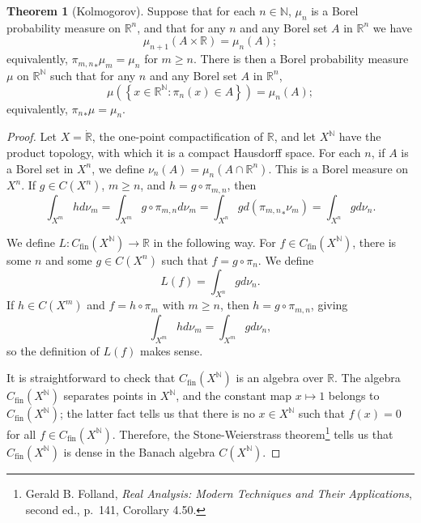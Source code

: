 \documentclass{article}
\theoremstyle{definition}
\newtheorem{theorem}{Theorem}
\theoremstyle{definition}
\begin{document}
\begin{theorem}[Kolmogorov]
Suppose that for each $n \in \mathbb{N}$, $\mu_n$ is a Borel probability measure on $\mathbb{R}^n$, and that for any $n$ and any Borel set $A$ in $\mathbb{R}^n$ we have
\[
\mu_{n+1}(A \times \mathbb{R}) = \mu_n(A);
\]
equivalently, ${\pi_{m,n}}_* \mu_m=\mu_n$ for $m \geq n$.
There is then a Borel probability measure $\mu$ on $\mathbb{R}^{\mathbb{N}}$ such that for any $n$ and any Borel set $A$
in $\mathbb{R}^n$,
\[
\mu\left( \left\{ x \in \mathbb{R}^\mathbb{N}: \pi_n(x) \in A\right\}\right)=\mu_n(A);
\]
equivalently, ${\pi_n}_* \mu = \mu_n$.
\end{theorem}
\begin{proof}
Let $X=\dot{\mathbb{R}}$, the one-point compactification of $\mathbb{R}$, and let $X^\mathbb{N}$ have the product topology, with which it is a compact Hausdorff space.
 For each $n$, if $A$ is a Borel set in $X^n$, we define $\nu_n(A) = \mu_n(A \cap \mathbb{R}^n)$. This is a Borel
measure on $X^n$. If $g \in C(X^n)$, $m \geq n$, and $h=g \circ \pi_{m,n}$, then
\[
\int_{X^m} h d\nu_m=\int_{X^m} g\circ \pi_{m,n} d\nu_m=\int_{X^n} g d({\pi_{m,n}}_* \nu_m)=\int_{X^n} g d\nu_n.
\]


We define $L:C_{\mathrm{fin}}(X^\mathbb{N}) \to \mathbb{R}$ in the following way.
For $f \in C_{\mathrm{fin}}(X^\mathbb{N})$, there is some $n$ and some $g \in C(X^n)$ such that $f=g \circ \pi_n$.
We define
\[
L(f) = \int_{X^n} g d\nu_n.
\]
If $h \in C(X^m)$ and $f=h \circ \pi_m$ with $m \geq n$, then $h=g \circ\pi_{m,n}$, giving
\[
\int_{X^m} h d\nu_m=\int_{X^m} g d\nu_n,
\]
so the definition of $L(f)$ makes sense. 

It is straightforward to check that $C_{\mathrm{fin}}(X^\mathbb{N})$ is an algebra over $\mathbb{R}$. 
The algebra $C_{\mathrm{fin}}(X^\mathbb{N})$ separates points in $X^\mathbb{N}$, and the constant map $x \mapsto 1$ belongs to $C_{\mathrm{fin}}(X^\mathbb{N})$;
the latter fact tells us that there is no $x \in X^\mathbb{N}$ such that $f(x) =0$ for all $f \in C_{\mathrm{fin}}(X^\mathbb{N})$. 
Therefore, the Stone-Weierstrass theorem\footnote{Gerald B. Folland, 
{\em Real Analysis: Modern Techniques and Their Applications}, second ed., p.~141, Corollary 4.50.} tells us that
$C_{\mathrm{fin}}(X^\mathbb{N})$ is dense in the Banach algebra $C(X^\mathbb{N})$. 


\end{proof}
\end{document}
